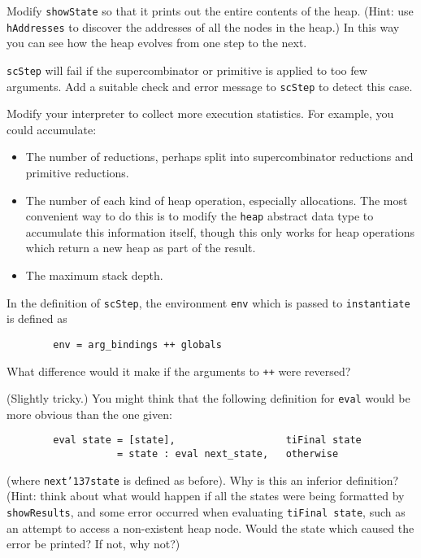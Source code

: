 \begin{exercise}
Modify \mbox{\tt showState} so that it prints out the entire contents of the heap.
(Hint: use \mbox{\tt hAddresses} to discover the addresses of all the nodes in the
heap.)
In this way you can see how the heap evolves from one step to the next.
\end{exercise}

\begin{exercise}
\mbox{\tt scStep} will fail
if the supercombinator or
primitive is applied to too few arguments.  Add a suitable
check and error message to \mbox{\tt scStep} to detect this case.
\end{exercise}

\begin{exercise}
\label{ex:templ:stats}
Modify your interpreter to collect more execution statistics.
For example, you could accumulate:
\begin{itemize}
\item
The number of reductions, perhaps split into supercombinator
reductions and primitive reductions.
\item
The number of each kind of heap operation, especially allocations.
The most convenient way to do this is to modify the \mbox{\tt heap} abstract
data type to accumulate this information itself, though this only
works for heap operations which return a new heap as part of the
result.
\item
The maximum stack depth.
\end{itemize}
\end{exercise}
\begin{exercise}
In the definition of \mbox{\tt scStep}, the environment \mbox{\tt env} which is passed to
\mbox{\tt instantiate} is defined as
\begin{verbatim}
        env = arg_bindings ++ globals
\end{verbatim}
What difference would it make if the arguments to \mbox{\tt ++} were reversed?
\end{exercise}
\begin{exercise}
\label{ex:templ:eval}
(Slightly tricky.)
You might think that the following definition for \mbox{\tt eval} would be more
obvious than the one given:
\begin{verbatim}
        eval state = [state],                   tiFinal state
                   = state : eval next_state,   otherwise
\end{verbatim}
(where \mbox{\tt next{\char'137}state} is defined as before).
Why is this an inferior definition?  (Hint: think about what
would happen if all the states were being formatted by \mbox{\tt showResults}, and
some error occurred when evaluating \mbox{\tt tiFinal\ state}, such as an attempt
to access a non-existent heap node.
Would the state which caused the error be printed?  If not, why not?)
\end{exercise}

